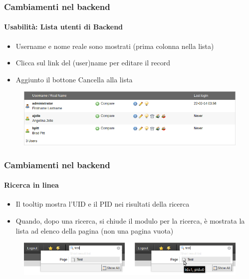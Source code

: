 
\begin{frame}[fragile]
	\frametitle{Cambiamenti nel backend}
	\framesubtitle{Usabilità: Lista utenti di Backend}

	\begin{itemize}
		\item Username e nome reale sono mostrati (prima colonna nella lista)
		\item Clicca sul link del (user)name per editare il record
		\item Aggiunto il bottone Cancella alla lista

	\end{itemize}

	\begin{figure}
		\includegraphics[width=0.95\linewidth]{Images/BackendChanges/BackendUserList.png}
	\end{figure}

\end{frame}


\begin{frame}[fragile]
	\frametitle{Cambiamenti nel backend}
	\framesubtitle{Ricerca in linea}

	\begin{itemize}
		\item Il tooltip mostra l'UID e il PID nei risultati della ricerca
		\item Quando, dopo una ricerca, si chiude il modulo per la ricerca, è mostrata la lista ad elenco della pagina (non una pagina vuota)
	\end{itemize}

	\begin{figure}
		\includegraphics[width=0.8\linewidth]{Images/BackendChanges/LiveSearchTooltip.png}
	\end{figure}

\end{frame}

